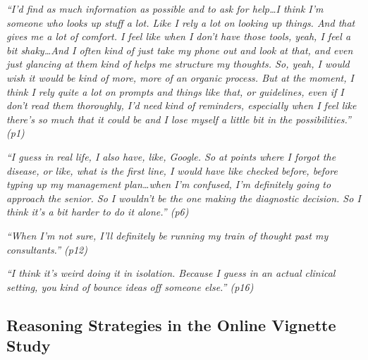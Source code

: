 \documentclass[a4paper, nobind]{templates/ociamthesis}
\begin{document}
\emph{``I'd find as much information as possible and to ask for help\ldots I think I'm someone who looks up stuff a lot. Like I rely a lot on looking up things. And that gives me a lot of comfort. I feel like when I don't have those tools, yeah, I feel a bit shaky\ldots And I often kind of just take my phone out and look at that, and even just glancing at them kind of helps me structure my thoughts. So, yeah, I would wish it would be kind of more, more of an organic process. But at the moment, I think I rely quite a lot on prompts and things like that, or guidelines, even if I don't read them thoroughly, I'd need kind of reminders, especially when I feel like there's so much that it could be and I lose myself a little bit in the possibilities.'' (p1)}

\emph{``I guess in real life, I also have, like, Google. So at points where I forgot the disease, or like, what is the first line, I would have like checked before, before typing up my management plan\ldots when I'm confused, I'm definitely going to approach the senior. So I wouldn't be the one making the diagnostic decision. So I think it's a bit harder to do it alone.'' (p6)}

\emph{``When I'm not sure, I'll definitely be running my train of thought past my consultants.'' (p12)}

\emph{``I think it's weird doing it in isolation. Because I guess in an actual clinical setting, you kind of bounce ideas off someone else.'' (p16)}

\subsection{Reasoning Strategies in the Online Vignette Study}\label{reasoning-strategies-in-the-online-vignette-study}
\end{document}
